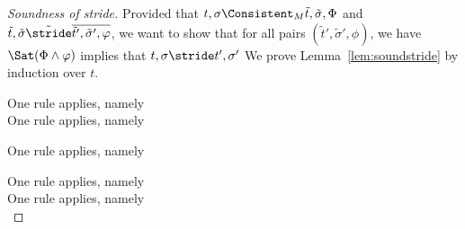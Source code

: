 \begin{proof}[Soundness of stride]

  Provided that $t,\sigma\Consistent_M\tilde{t},\tilde{\sigma},\Phi$ and $\tilde{t},\tilde{\sigma}\tilde{\stride} \overline{\tilde{t}',\tilde{\sigma}',\phi}$,
  we want to show that for all pairs $(\tilde{t}',\tilde{\sigma}',\phi)$,
  we have $\Sat(\Phi\land\phi)$ implies that $t,\sigma\stride t',\sigma'$
  We prove Lemma~\ref{lem:soundstride} by induction over $t$.



  { One rule applies, namely \\
   }
  {One rule applies, namely \\
  }

   {One rule applies, namely \\
  }

   {One rule applies, namely \\
   }
   {One rule applies, namely \\
   }





\end{proof}
